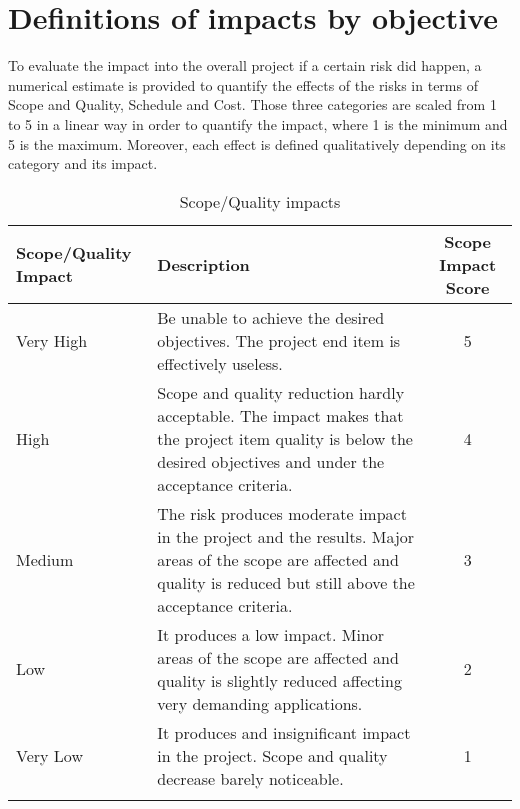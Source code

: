 \section{Definitions of impacts by objective}
\label{3.2}
To evaluate the impact into the overall project if a certain risk did happen, a numerical estimate is provided to quantify the effects of the risks in terms of Scope and Quality, Schedule and Cost. Those three categories are scaled from 1 to 5 in a linear way in order to quantify the impact, where 1 is the minimum and 5 is the maximum. Moreover, each effect is defined qualitatively depending on its category and its impact. 

\begin{longtable}[H]{l >{\raggedright\arraybackslash}p{6.3cm} c}
	
	\toprule[2pt]
	
	\textbf{Scope/Quality Impact} &  \textbf{Description}  & \textbf{Scope Impact Score} \\
	
	\midrule [1.5pt]
	\endhead
	
	Very High & Be unable to achieve the desired objectives. The project end item is effectively useless. & 5 
	\vspace{0.2cm} \\
	
	\midrule
	
	High & Scope and quality reduction hardly acceptable. The impact makes that the project item quality is below the desired objectives and under the acceptance criteria. & 4 
	\vspace{0.2cm} \\
	
	\midrule
	
	Medium & The risk produces moderate impact in the project and the results. Major areas of the scope are affected and quality is reduced but still above the acceptance criteria. & 3
	\vspace{0.2cm} \\

	\midrule

	Low & It produces a low impact. Minor areas of the scope are affected and quality is slightly reduced affecting very demanding applications. & 2
	\vspace{0.2cm} \\

	\midrule

	Very Low & It produces and insignificant impact in the project. Scope and quality decrease barely noticeable. & 1
	\vspace{0.2cm} \\
		
	\bottomrule[2pt]
	
	\caption{Scope/Quality impacts}

\end{longtable}




